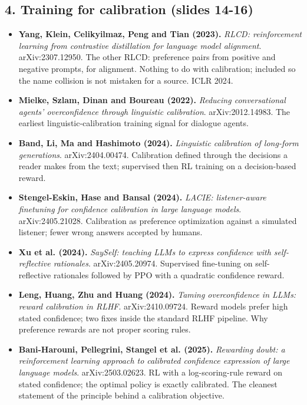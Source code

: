 \documentclass[11pt,letterpaper]{article}
\begin{document}
\subsection*{4. Training for calibration (slides 14-16)}
\begin{itemize}[leftmargin=1.2em,itemsep=3pt]\sloppy
\item \textbf{Yang, Klein, Celikyilmaz, Peng and Tian (2023).} \textit{RLCD: reinforcement learning from contrastive distillation for language model alignment}. arXiv:2307.12950. The other RLCD: preference pairs from positive and negative prompts, for alignment. Nothing to do with calibration; included so the name collision is not mistaken for a source. ICLR 2024.
\item \textbf{Mielke, Szlam, Dinan and Boureau (2022).} \textit{Reducing conversational agents' overconfidence through linguistic calibration}. arXiv:2012.14983. The earliest linguistic-calibration training signal for dialogue agents.
\item \textbf{Band, Li, Ma and Hashimoto (2024).} \textit{Linguistic calibration of long-form generations}. arXiv:2404.00474. Calibration defined through the decisions a reader makes from the text; supervised then RL training on a decision-based reward.
\item \textbf{Stengel-Eskin, Hase and Bansal (2024).} \textit{LACIE: listener-aware finetuning for confidence calibration in large language models}. arXiv:2405.21028. Calibration as preference optimization against a simulated listener; fewer wrong answers accepted by humans.
\item \textbf{Xu et al. (2024).} \textit{SaySelf: teaching LLMs to express confidence with self-reflective rationales}. arXiv:2405.20974. Supervised fine-tuning on self-reflective rationales followed by PPO with a quadratic confidence reward.
\item \textbf{Leng, Huang, Zhu and Huang (2024).} \textit{Taming overconfidence in LLMs: reward calibration in RLHF}. arXiv:2410.09724. Reward models prefer high stated confidence; two fixes inside the standard RLHF pipeline. Why preference rewards are not proper scoring rules.
\item \textbf{Bani-Harouni, Pellegrini, Stangel et al. (2025).} \textit{Rewarding doubt: a reinforcement learning approach to calibrated confidence expression of large language models}. arXiv:2503.02623. RL with a log-scoring-rule reward on stated confidence; the optimal policy is exactly calibrated. The cleanest statement of the principle behind a calibration objective.

\end{itemize}
\end{document}
